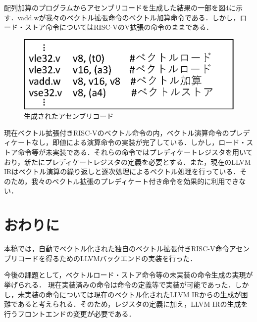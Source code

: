 ﻿\documentclass[a4j]{jarticle}
\begin{document}
配列加算のプログラムからアセンブリコードを生成した結果の一部を図4に示す．vadd.wが我々のベクトル拡張命令のベクトル加算命令である．しかし，ロード・ストア命令についてはRISC-VのV拡張の命令のままである．

\begin{figure}[tb]
    \centering
    \includegraphics[scale=0.4]{miqs_assembly.eps}
    \vspace{-2truemm}
    \caption{生成されたアセンブリコード}
    \vspace{-4truemm}
    \label{fig:assembly}
\end{figure}

現在ベクトル拡張付きRISC-Vのベクトル命令の内，ベクトル演算命令のプレディケートなし，即値による演算命令の実装が完了している．しかし，ロード・ストア命令等が未実装である．それらの命令ではプレディケートレジスタを用いており，新たにプレディケートレジスタの定義を必要とする．また，現在のLLVM IRはベクトル演算の繰り返しと逐次処理によるベクトル処理を行っている．そのため，我々のベクトル拡張のプレディケート付き命令を効果的に利用できない．

\section{おわりに}
本稿では，自動でベクトル化された独自のベクトル拡張付きRISC-V命令アセンブリコードを得るためのLLVMバックエンドの実装を行った．

今後の課題として，ベクトルロード・ストア命令等の未実装の命令生成の実現が挙げられる．
現在実装済みの命令は命令の定義等で実装が可能であった．しかし，未実装の命令については現在のベクトル化されたLLVM IRからの生成が困難であると考えられる．そのため，レジスタの定義に加え，LLVM IRの生成を行うフロントエンドの変更が必要である．
\end{document}
